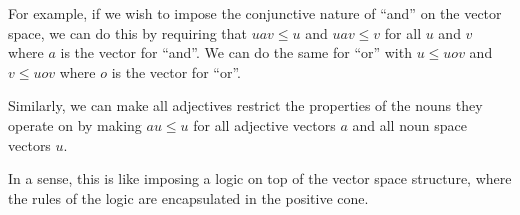 \documentclass{article}
\begin{document}
For example, if we wish to impose the conjunctive nature of ``and'' on
the vector space, we can do this by requiring that $uav \le u$ and
$uav \le v$ for all $u$ and $v$ where $a$ is the vector for
``and''. We can do the same for ``or'' with $u \le uov$ and $v\le uov$
where $o$ is the vector for ``or''.

Similarly, we can make all adjectives restrict the properties of the
nouns they operate on by making $au \le u$ for all adjective vectors
$a$ and all noun space vectors $u$.

In a sense, this is like imposing a logic on top of the vector space
structure, where the rules of the logic are encapsulated in the
positive cone.

%

%
\end{document}
